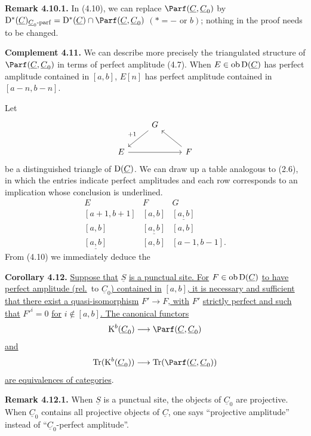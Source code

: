 \textbf{Remark 4.10.1.} In (4.10), we can replace \(\Parf(\underline{C},\underline{C}_0)\) by \(\Dpx^*(\underline{C})_{\underline{C}_0\text{-}\mathrm{parf}}=\Dpx^*(\underline{C})\cap\Parf(\underline{C},\underline{C}_0)\) \((*=-\text{ or }b)\); nothing in the proof needs to be changed.

\textbf{Complement 4.11.} We can describe more precisely the triangulated structure of \(\Parf(\underline{C},\underline{C}_0)\) in terms of perfect amplitude (4.7). When \(E\in\operatorname{ob}\mathrm D(\underline{C})\) has perfect amplitude contained in \([a,b]\), \(E[n]\) has perfect amplitude contained in \([a-n,b-n]\).

%
Let
\[
\begin{tikzcd}
& G \arrow[dl,"+1"'] & \\
E \arrow[rr] && F \arrow[ul]
\end{tikzcd}
\]
be a distinguished triangle of \(\mathrm D(\underline{C})\). We can draw up a table analogous to (2.6), in which the entries indicate perfect amplitudes and each row corresponds to an implication whose conclusion is underlined.
\[
\begin{array}{ccc}
E&F&G\\[0.3em]
{}[a+1,b+1]&{}[a,b]&\underline{[a,b]}\\
{}[a,b]&\underline{[a,b]}&{}[a,b]\\
\underline{[a,b]}&{}[a,b]&{}[a-1,b-1].
\end{array}
\]
From (4.10) we immediately deduce the

\textbf{Corollary 4.12.} \uline{Suppose that} \(\underline{S}\) \uline{is a punctual site. For} \(F\in\operatorname{ob}\mathrm D(\underline{C})\) \uline{to have perfect amplitude (rel.}\ to \(\underline{C}_0\)\uline{) contained in} \([a,b]\)\uline{, it is necessary and sufficient that there exist a quasi-isomorphism} \(F'\to F\)\uline{, with} \(F'\) \uline{strictly perfect and such that} \(F'^i=0\) \uline{for} \(i\notin[a,b]\)\uline{. The canonical functors}
\[
  \Kpx^b(\underline{C}_0)\longrightarrow\Parf(\underline{C},\underline{C}_0)
\]
\uline{and}
\[
  \Tr(\Kpx^b(\underline{C}_0))\longrightarrow\Tr(\Parf(\underline{C},\underline{C}_0))
\]
\uline{are equivalences of categories}.

\textbf{Remark 4.12.1.} When \(\underline{S}\) is a punctual site, the objects of \(\underline{C}_0\) are projective. When \(\underline{C}_0\) contains all projective objects of \(\underline{C}\), one says ``projective amplitude'' instead of ``\(\underline{C}_0\)-perfect amplitude''.

